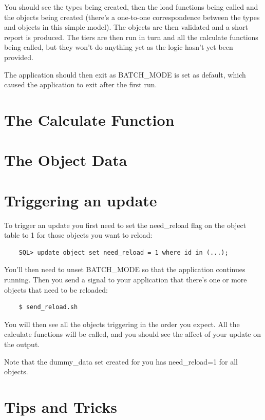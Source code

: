 \documentclass{report}
\begin{document}
You should see the types being created, then the load functions being called and the objects being created (there's a one-to-one correspondence between the types and objects in this simple model). The objects are then validated and a short report is produced. The tiers are then run in turn and all the calculate functions being called, but they won't do anything yet as the logic hasn't yet been provided.

The application should then exit as BATCH_MODE is set as default, which caused the application to exit after the first run.

\section{The Calculate Function}

\section{The Object Data}

\section{Triggering an update}

To trigger an update you first need to set the need_reload flag on the object table to 1 for those objects you want to reload:

\begin{verbatim}
    SQL> update object set need_reload = 1 where id in (...);
\end{verbatim}

You'll then need to unset BATCH_MODE so that the application continues running. Then you send a signal to your application that there's one or more objects that need to be reloaded:

\begin{verbatim}
    $ send_reload.sh 
\end{verbatim}

You will then see all the objects triggering in the order you expect. All the calculate functions will be called, and you should see the affect of your update on the output.

Note that the dummy_data set created for you has need_reload=1 for all objects.

\section{Tips and Tricks}
\end{document}
